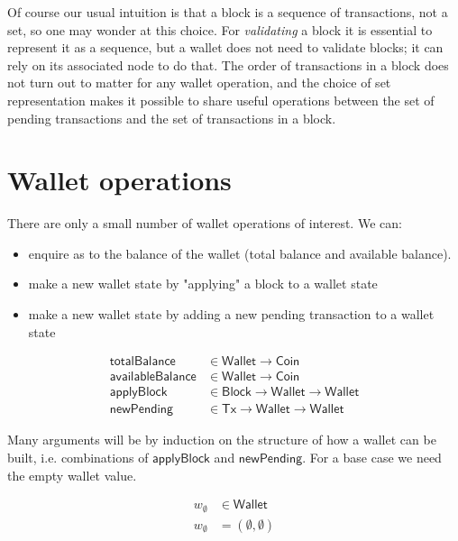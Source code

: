 \documentclass{article}
\begin{document}
Of course our usual intuition is that a block is a sequence of transactions,
not a set, so one may wonder at this choice. For \emph{validating} a block it
is essential to represent it as a sequence, but a wallet does not need to
validate blocks; it can rely on its associated node to do that. The order of
transactions in a block does not turn out to matter for any wallet operation,
and the choice of set representation makes it possible to share useful
operations between the set of pending transactions and the set of transactions
in a block.

\section{Wallet operations}
\label{sec:wallet_operations}

There are only a small number of wallet operations of interest. We can:
\begin{itemize}
\item enquire as to the balance of the wallet (total balance and
      available balance).
\item make a new wallet state by "applying" a block to a wallet state
\item make a new wallet state by adding a new pending transaction to a wallet
      state
\end{itemize}

\begin{equation}
\begin{split}
\mathsf{totalBalance}     & \in \mathsf{Wallet} \to \mathsf{Coin} \\
\mathsf{availableBalance} & \in \mathsf{Wallet} \to \mathsf{Coin} \\
\mathsf{applyBlock}       & \in \mathsf{Block} \to \mathsf{Wallet}
                                             \to \mathsf{Wallet} \\
\mathsf{newPending}       & \in \mathsf{Tx} \to \mathsf{Wallet}
                                          \to \mathsf{Wallet}
\end{split}
\end{equation}

Many arguments will be by induction on the structure of how a wallet can be
built, i.e. combinations of $\mathsf{applyBlock}$ and $\mathsf{newPending}$.
For a base case we need the empty wallet value.

\begin{equation}
\begin{split}
w_\emptyset & \in \mathsf{Wallet} \\
w_\emptyset & = (\emptyset, \emptyset)
\end{split}
\end{equation}
\end{document}

